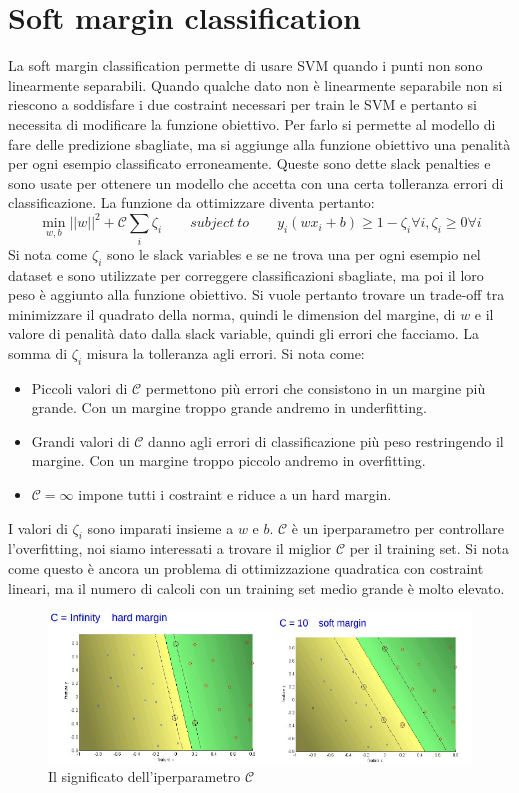 \section{Soft margin classification}
La soft margin classification permette di usare SVM quando i punti non sono linearmente separabili.
Quando qualche dato non \`e linearmente separabile non si riescono a soddisfare i due costraint necessari per train le SVM e pertanto si necessita di modificare la funzione obiettivo.
Per farlo si permette al modello di fare delle predizione sbagliate, ma si aggiunge alla funzione obiettivo una penalit\`a per ogni esempio classificato erroneamente.
Queste sono dette slack penalties e sono usate per ottenere un modello che accetta con una certa tolleranza errori di classificazione.
La funzione da ottimizzare diventa pertanto:
$$\min_{w,b}||w||^2+\mathcal{C}\sum_i\zeta_i\qquad subject\ to\qquad y_i(wx_i+b)\ge 1 -\zeta_i\forall i, \zeta_i \ge 0 \forall i$$
Si nota come $\zeta_i$ sono le slack variables e se ne trova una per ogni esempio nel dataset e sono utilizzate per correggere classificazioni sbagliate, ma poi il loro peso \`e aggiunto alla funzione obiettivo.
Si vuole pertanto trovare un trade-off tra minimizzare il quadrato della norma, quindi le dimension del margine, di $w$ e il valore di penalit\`a dato dalla slack variable, quindi gli errori che facciamo.
La somma di $\zeta_i$ misura la tolleranza agli errori.
Si nota come:
\begin{multicols}{2}
	\begin{itemize}
		\item Piccoli valori di $\mathcal{C}$ permettono pi\`u errori che consistono in un margine pi\`u grande. Con un margine troppo grande andremo in underfitting.
		\item Grandi valori di $\mathcal{C}$ danno agli errori di classificazione pi\`u peso restringendo il margine. Con un margine troppo piccolo andremo in overfitting.
		\item $\mathcal{C} = \infty$ impone tutti i costraint e riduce a un hard margin.
	\end{itemize}
\end{multicols}
I valori di $\zeta_i$ sono imparati insieme a $w$ e $b$.
$\mathcal{C}$ \`e un iperparametro per controllare l'overfitting, noi siamo interessati a trovare il miglior $\mathcal{C}$ per il training set.
Si nota come questo \`e ancora un problema di ottimizzazione quadratica con costraint lineari, ma il numero di calcoli con un training set medio grande \`e molto elevato.
\begin{figure}
	\centering
	\includegraphics[width=0.6\linewidth]{imgs/chapter10/img1}
	\caption{Il significato dell'iperparametro $\mathcal{C}$}
	\label{fig:chapter10-01}
\end{figure}

